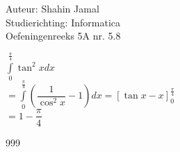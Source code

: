 \documentclass[a4paper]{article}
\begin{document}
  
\noindent \large Auteur: Shahin Jamal \\
\noindent \large Studierichting: Informatica\\
\noindent \large Oefeningenreeks 5A nr. 5.8\\

\medskip

\normalsize

$\displaystyle\int\limits_0^{\tfrac{\pi}{4}} \tan^2x dx$\\

$= \displaystyle\int\limits_0^{\tfrac{\pi}{4}} \left(\dfrac{1}{\cos^2x} - 1\right) dx = \left[\tan x - x\right]_0^{\tfrac{\pi}{4}} $\\

$= 1 - \dfrac{\pi}{4}$\\

\begin{thebibliography}{999}
\end{thebibliography}
\end{document}
